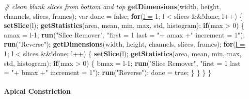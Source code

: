 \documentclass[11pt,singlespacinge,twoside]{reedthesis} %
\newenvironment{Shaded}{}{}
\newcommand{\CommentTok}[1]{\textit{#1}}
\newcommand{\ControlFlowTok}[1]{\textbf{#1}}
\newcommand{\DataTypeTok}[1]{\underline{#1}}
\newcommand{\DecValTok}[1]{#1}
\newcommand{\KeywordTok}[1]{\textbf{#1}}
\newcommand{\NormalTok}[1]{#1}
\newcommand{\OperatorTok}[1]{#1}
\newcommand{\StringTok}[1]{#1}
\theoremstyle{definition}
\theoremstyle{definition}
\theoremstyle{definition}
\theoremstyle{remark}
\begin{document}
\begin{Shaded}
\begin{Highlighting}[numbers=left,,]
\CommentTok{# clean blank slices from bottom and top}
    \KeywordTok{getDimensions}\NormalTok{(width, height, channels, slices, frames);}
\NormalTok{    var done =}\StringTok{ }\NormalTok{false; }
    \ControlFlowTok{for}\NormalTok{(}\DataTypeTok{l =} \DecValTok{1}\NormalTok{; l }\OperatorTok{<}\StringTok{ }\NormalTok{slices }\OperatorTok{&&!}\NormalTok{done; l}\OperatorTok{++}\NormalTok{) \{}
        \KeywordTok{setSlice}\NormalTok{(l);}
        \KeywordTok{getStatistics}\NormalTok{(area, mean, min, max, std, histogram);}
        \ControlFlowTok{if}\NormalTok{(max }\OperatorTok{>}\StringTok{ }\DecValTok{0}\NormalTok{) \{}
\NormalTok{        amax =}\StringTok{ }\NormalTok{l}\DecValTok{-1}\NormalTok{;}
            \KeywordTok{run}\NormalTok{(}\StringTok{"Slice Remover"}\NormalTok{, }\StringTok{"first = 1 last = "}\OperatorTok{+}\StringTok{ }\NormalTok{amax }\OperatorTok{+}\StringTok{" increment = 1"}\NormalTok{);}
            \KeywordTok{run}\NormalTok{(}\StringTok{"Reverse"}\NormalTok{);}
            \KeywordTok{getDimensions}\NormalTok{(width, height, channels, slices, frames);}
            \ControlFlowTok{for}\NormalTok{(}\DataTypeTok{l =} \DecValTok{1}\NormalTok{; l }\OperatorTok{<}\StringTok{ }\NormalTok{slices }\OperatorTok{&&!}\NormalTok{done; l}\OperatorTok{++}\NormalTok{) \{}
                \KeywordTok{setSlice}\NormalTok{(l);}
                \KeywordTok{getStatistics}\NormalTok{(area, mean, min, max, std, histogram);}
                \ControlFlowTok{if}\NormalTok{(max }\OperatorTok{>}\StringTok{ }\DecValTok{0}\NormalTok{) \{}
\NormalTok{                bmax =}\StringTok{ }\NormalTok{l}\DecValTok{-1}\NormalTok{;}
                    \KeywordTok{run}\NormalTok{(}\StringTok{"Slice Remover"}\NormalTok{, }\StringTok{"first = 1 last = "}\OperatorTok{+}\StringTok{ }\NormalTok{bmax }\OperatorTok{+}\StringTok{" increment = 1"}\NormalTok{);}
                    \KeywordTok{run}\NormalTok{(}\StringTok{"Reverse"}\NormalTok{);}
\NormalTok{                    done =}\StringTok{ }\NormalTok{true;}
\NormalTok{                    \}}
\NormalTok{            \}}
\NormalTok{        \}}
\NormalTok{    \}}
\end{Highlighting}
\end{Shaded}
\normalsize

\hypertarget{apical-constriction-1}{%
\paragraph{Apical Constriction}\label{apical-constriction-1}}
\end{document}
